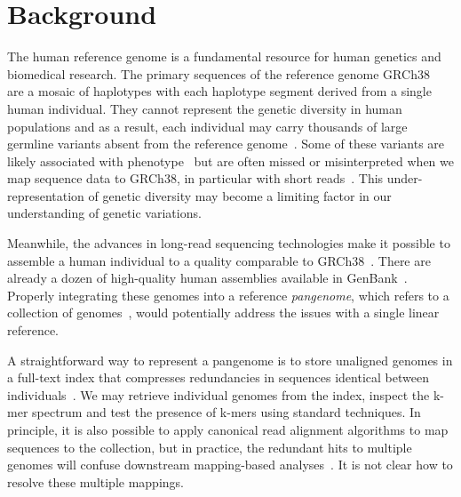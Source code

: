 \documentclass[twocolumn]{bmcart}
\begin{document}
\section*{Background}

The human reference genome is a fundamental resource for human genetics and
biomedical research. The primary sequences of the reference genome
GRCh38~\cite{Schneider:2017aa} are a mosaic of haplotypes with each haplotype segment derived
from a single human individual. They cannot represent the genetic diversity in
human populations and as a result, each individual may carry thousands of large
germline variants absent from the reference genome~\cite{Huddleston:2017aa}.
Some of these variants are likely associated with phenotype~\cite{Eichler_2010}
but are often missed or misinterpreted when we map sequence data to GRCh38, in
particular with short reads~\cite{Li:2018aa}. This under-representation of
genetic diversity may become a limiting factor in our understanding of genetic
variations.

Meanwhile, the advances in long-read sequencing technologies make it possible
to assemble a human individual to a quality comparable to
GRCh38~\cite{Schneider:2017aa,Wenger_2019}. There are already a dozen of
high-quality human assemblies available in GenBank~\cite{Audano:2019aa}.
Properly integrating these genomes into a reference \emph{pangenome}, which
refers to a collection of genomes~\cite{cpgc:2016aa}, would potentially address
the issues with a single linear reference.

A straightforward way to represent a pangenome is to store unaligned genomes
in a full-text index that compresses redundancies in sequences identical
between individuals~\cite{Makinen:2010aa,Liu_2016,Boucher_2019}. We may
retrieve individual genomes from the index, inspect the k-mer spectrum and test
the presence of k-mers using standard techniques. In principle, it is also
possible to apply canonical read alignment algorithms to map sequences to
the collection, but in practice, the redundant hits to multiple genomes will
confuse downstream mapping-based analyses~\cite{NA2016159}. It is not clear how
to resolve these multiple mappings.
\end{document}
